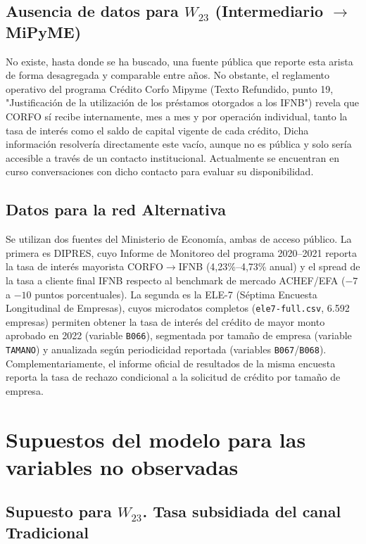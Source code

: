 \documentclass[11pt]{article}
\begin{document}
\subsection{Ausencia de datos para $W_{23}$ (Intermediario $\to$ MiPyME)}

No existe, hasta donde se ha buscado, una fuente pública que reporte esta arista de forma desagregada y comparable entre años. No obstante, el reglamento operativo del programa Crédito Corfo Mipyme (Texto Refundido, punto 19, "Justificación de la utilización de los préstamos otorgados a los IFNB") revela que CORFO sí recibe internamente, mes a mes y por operación individual, tanto la tasa de interés como el saldo de capital vigente de cada crédito, Dicha información resolvería directamente este vacío, aunque no es pública y solo sería accesible a través de un contacto institucional. Actualmente se encuentran en curso conversaciones con dicho contacto para evaluar su disponibilidad.

\subsection{Datos para la red Alternativa}

Se utilizan dos fuentes del Ministerio de Economía, ambas de acceso público. La primera es DIPRES, cuyo Informe de Monitoreo del programa 2020--2021 reporta la tasa de interés mayorista CORFO$\to$IFNB (4,23\%--4,73\% anual) y el spread de la tasa a cliente final IFNB respecto al benchmark de mercado ACHEF/EFA ($-7$ a $-10$ puntos porcentuales). La segunda es la ELE-7 (Séptima Encuesta Longitudinal de Empresas), cuyos microdatos completos (\texttt{ele7-full.csv}, 6.592 empresas) permiten obtener la tasa de interés del crédito de mayor monto aprobado en 2022 (variable \texttt{B066}), segmentada por tamaño de empresa (variable \texttt{TAMANO}) y anualizada según periodicidad reportada (variables \texttt{B067}/\texttt{B068}). Complementariamente, el informe oficial de resultados de la misma encuesta reporta la tasa de rechazo condicional a la solicitud de crédito por tamaño de empresa.

\section{Supuestos del modelo para las variables no observadas}
\label{sec:supuestos}

\subsection{Supuesto para $W_{23}$. Tasa subsidiada del canal Tradicional}
\end{document}
